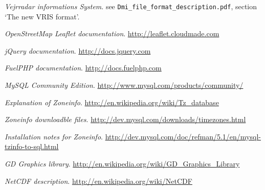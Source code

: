 \renewcommand\bibname{References}

\begin{thebibliography}{10}
\emph{Vejrradar informations System}.
see \texttt{Dmi\_file\_format\_description.pdf}, section `The new VRIS format'.

\emph{OpenStreetMap Leaflet documentation}.
\url{http://leaflet.cloudmade.com}

\emph{jQuery documentation}.
\url{http://docs.jquery.com}

\emph{FuelPHP documentation}.
\url{http://docs.fuelphp.com}

\emph{MySQL Community Edition}.
\url{http://www.mysql.com/products/community/}

\emph{Explanation of Zoneinfo}.
\url{http://en.wikipedia.org/wiki/Tz_database}

\emph{Zoneinfo downloadble files}.
\url{http://dev.mysql.com/downloads/timezones.html}

\emph{Installation notes for Zoneinfo}.
\url{http://dev.mysql.com/doc/refman/5.1/en/mysql-tzinfo-to-sql.html}

\emph{GD Graphics library}.
\url{http://en.wikipedia.org/wiki/GD_Graphics_Library}

\emph{NetCDF description}.
\url{http://en.wikipedia.org/wiki/NetCDF}

\end{thebibliography}
